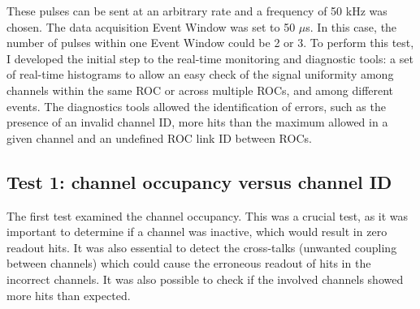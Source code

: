 These pulses can be sent at an arbitrary rate and a frequency 
of 50 kHz was chosen. 
The data acquisition Event Window was set 
to 50 $\mu$s. 
In this case, the number of pulses within 
one Event Window could be 2 or 3.
To perform this test, I developed the initial step to the  
real-time monitoring and diagnostic tools: 
a set of real-time histograms to allow an 
easy check of the signal uniformity among 
channels within the same ROC or across 
multiple ROCs, and among different events.
The diagnostics tools allowed the identification 
of errors, such as the presence of an 
invalid channel ID, more hits than the maximum 
allowed in a given channel 
and an undefined ROC link ID between ROCs.

\subsection{Test 1: channel occupancy versus channel ID}\label{nhitvschid}
The first test examined the channel occupancy. 
This was a crucial test, as it was important to determine if a 
channel was inactive, which would result in zero readout hits. 
It was also essential to detect the cross-talks (unwanted 
coupling between channels) which could cause the erroneous 
readout of hits in the incorrect channels.
It was also possible to check if the involved 
channels showed more hits than expected. 

